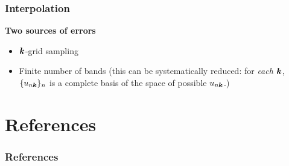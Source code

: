 \documentclass[t]{beamer}
\begin{document}
\begin{frame}
\frametitle{Interpolation}

\textbf{Two sources of errors} \begin{itemize}
    \item $\vb*{k}$-grid sampling 
    \item Finite number of bands
    (this can be systematically reduced: 
    for \emph{each} $\vb*{k}$, 
    $\{u_{n \vb*{k}}\}_n$ is a complete basis of 
    the space of possible $u_{n \vb*{k}}$.)
\end{itemize}

\end{frame}



\section{References}

\begin{frame}[allowframebreaks]
\frametitle{References}

\printbibliography

\end{frame}
\end{document}
